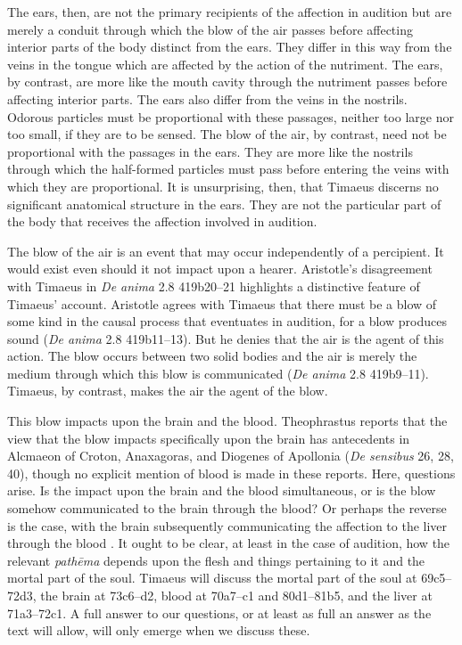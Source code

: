 The ears, then, are not the primary recipients of the affection in audition but are merely a conduit through which the blow of the air passes before affecting interior parts of the body distinct from the ears. They differ in this way from the veins in the tongue which are affected by the action of the nutriment. The ears, by contrast, are more like the mouth cavity through the nutriment passes before affecting interior parts. The ears also differ from the veins in the nostrils. Odorous particles must be proportional with these passages, neither too large nor too small, if they are to be sensed. The blow of the air, by contrast, need not be proportional with the passages in the ears. They are more like the nostrils through which the half-formed particles must pass before entering the veins with which they are proportional. It is unsurprising, then, that Timaeus discerns no significant anatomical structure in the ears. They are not the particular part of the body that receives the affection involved in audition.

The blow of the air is an event that may occur independently of a percipient. It would exist even should it not impact upon a hearer. Aristotle's disagreement with Timaeus in \emph{De anima} 2.8 419b20--21 highlights a distinctive feature of Timaeus' account. Aristotle agrees with Timaeus that there must be a blow of some kind in the causal process that eventuates in audition, for a blow produces sound (\emph{De anima} 2.8 419b11--13). But he denies that the air is the agent of this action. The blow occurs between two solid bodies and the air is merely the medium through which this blow is communicated (\emph{De anima} 2.8 419b9--11). Timaeus, by contrast, makes the air the agent of the blow. 

This blow impacts upon the brain and the blood. Theophrastus reports that the view that the blow impacts specifically upon the brain has antecedents in Alcmaeon of Croton, Anaxagoras, and Diogenes of Apollonia (\emph{De sensibus} 26, 28, 40), though no explicit mention of blood is made in these reports. Here, questions arise. Is the impact upon the brain and the blood simultaneous, or is the blow somehow communicated to the brain through the blood? Or perhaps the reverse is the case, with the brain subsequently communicating the affection to the liver through the blood \citep[477]{Taylor:1928qb}. It ought to be clear, at least in the case of audition, how the relevant \emph{pathēma} depends upon the flesh and things pertaining to it and the mortal part of the soul. Timaeus will discuss the mortal part of the soul at 69c5--72d3, the brain at 73c6--d2, blood at 70a7--c1 and 80d1--81b5, and the liver at 71a3--72c1. A full answer to our questions, or at least as full an answer as the text will allow, will only emerge when we discuss these.

